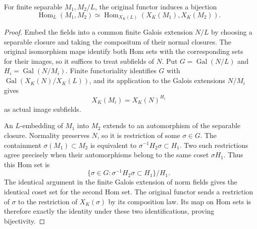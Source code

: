 \begin{lemma}
\label{fw:separable-finite-full-faithful}
\leanok
For finite separable $M_1,M_2/L$, the original functor induces a
bijection
\[
 \operatorname{Hom}_L(M_1,M_2)\simeq
 \operatorname{Hom}_{X_K(L)}(X_K(M_1),X_K(M_2)).
\]
\end{lemma}
\begin{proof}
Embed the fields into a common finite Galois extension $N/L$ by
choosing a separable closure and taking the compositum of their
normal closures. The original isomorphism maps identify both Hom
sets with the corresponding sets for their images, so it suffices
to treat subfields of $N$. Put $G=\operatorname{Gal}(N/L)$ and
$H_i=\operatorname{Gal}(N/M_i)$. Finite functoriality identifies
$G$ with $\operatorname{Gal}(X_K(N)/X_K(L))$, and its application
to the Galois extensions $N/M_i$ gives
\[
 X_K(M_i)=X_K(N)^{H_i}
\]
as actual image subfields.

An $L$-embedding of $M_1$ into $M_2$ extends to an automorphism of
the separable closure. Normality preserves $N$, so it is restriction
of some $\sigma\in G$. The containment $\sigma(M_1)\subset M_2$
is equivalent to $\sigma^{-1}H_2\sigma\subset H_1$. Two such
restrictions agree precisely when their automorphisms belong to the
same coset $\sigma H_1$. Thus this Hom set is
\[
 \{\sigma\in G:\sigma^{-1}H_2\sigma\subset H_1\}/H_1.
\]
The identical argument in the finite Galois extension of norm fields
gives the identical coset set for the second Hom set. The original
functor sends a restriction of $\sigma$ to the restriction of
$X_K(\sigma)$ by its composition law. Its map on Hom sets is therefore
exactly the identity under these two identifications, proving bijectivity.
\end{proof}

